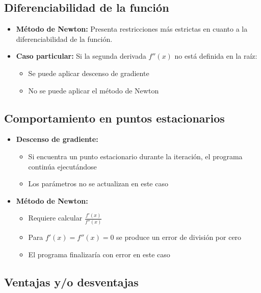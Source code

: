 \documentclass[conference]{IEEEtran}
\begin{document}
\subsection*{Diferenciabilidad de la función}
\begin{itemize}
    \item \textbf{Método de Newton:} Presenta restricciones más estrictas en cuanto a la diferenciabilidad de la función.
    
    \item \textbf{Caso particular:} Si la segunda derivada $f''(x)$ no está definida en la raíz:
    \begin{itemize}
        \item Se puede aplicar descenso de gradiente
        \item No se puede aplicar el método de Newton
    \end{itemize}
\end{itemize}

\subsection*{Comportamiento en puntos estacionarios}
\begin{itemize}
    \item \textbf{Descenso de gradiente:}
    \begin{itemize}
        \item Si encuentra un punto estacionario durante la iteración, el programa continúa ejecutándose
        \item Los parámetros no se actualizan en este caso
    \end{itemize}
    
    \item \textbf{Método de Newton:}
    \begin{itemize}
        \item Requiere calcular $\frac{f'(x)}{f''(x)}$
        \item Para $f'(x) = f''(x) = 0$ se produce un error de división por cero
        \item El programa finalizaría con error en este caso
    \end{itemize}
\end{itemize}

\subsection{Ventajas y/o desventajas}
\end{document}
